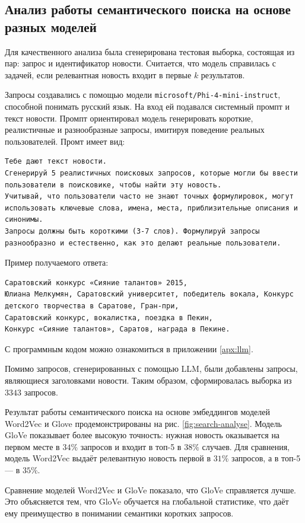 \documentclass[coursework]{SCWorks}
\begin{document}
\subsection{Анализ работы семантического поиска на основе разных моделей}
Для качественного анализа была сгенерирована тестовая выборка, состоящая из пар: запрос и идентификатор новости. Считается, что модель справилась с задачей, если релевантная новость входит в первые $k$ результатов.

Запросы создавались с помощью модели \verb|microsoft/Phi-4-mini-instruct|, способной понимать русский язык. На вход ей подавался системный промпт и текст новости. Промпт ориентировал модель генерировать короткие, реалистичные и разнообразные запросы, имитируя поведение реальных пользователей. Промт имеет вид:
\begin{verbatim}
Тебе дают текст новости. 
Сгенерируй 5 реалистичных поисковых запросов, которые могли бы ввести пользователи в поисковике, чтобы найти эту новость. 
Учитывай, что пользователи часто не знают точных формулировок, могут использовать ключевые слова, имена, места, приблизительные описания и синонимы. 
Запросы должны быть короткими (3-7 слов). Формулируй запросы разнообразно и естественно, как это делают реальные пользователи.
\end{verbatim}

Пример получаемого ответа:
\begin{verbatim}
Саратовский конкурс «Сияние талантов» 2015, 
Юлиана Мелкумян, Саратовский университет, победитель вокала, Конкурс детского творчества в Саратове, Гран-при, 
Саратовский конкурс, вокалистка, поездка в Пекин, 
Конкурс «Сияние талантов», Саратов, награда в Пекине.
\end{verbatim}

С программным кодом можно ознакомиться в приложении \ref{apx:llm}.

Помимо запросов, сгенерированных с помощью LLM, были добавлены запросы, являющиеся заголовками новости.
Таким образом, сформировалась выборка из $3343$ запросов.

Результат работы семантического поиска на основе эмбеддингов моделей Word2Vec и Glove продемонстрированы на рис. \ref{fig:search-analyse}. Модель GloVe показывает более высокую точность: нужная новость оказывается на первом месте в $34\%$ запросов и входит в топ-5 в $38\%$ случаев. Для сравнения, модель Word2Vec выдаёт релевантную новость первой в $31\%$ запросов, а в топ-5 — в $35\%$.

Сравнение моделей Word2Vec и GloVe показало, что GloVe справляется лучше. Это объясняется тем, что GloVe обучается на глобальной статистике, что даёт ему преимущество в понимании семантики коротких запросов.
\end{document}
